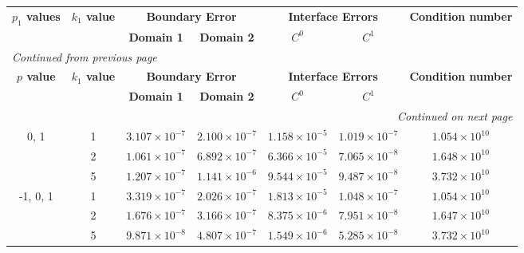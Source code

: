 \begin{table}[!htbp]
    \centering
    \begin{longtable}{ccccccc}
        \toprule
        \multicolumn{1}{c}{\textbf{\(p_1\) values}} & \multicolumn{1}{c}{\textbf{\(k_1\) value}} & \multicolumn{2}{c}{\textbf{Boundary Error}} & \multicolumn{2}{c}{\textbf{Interface Errors}} & \multicolumn{1}{c}{\textbf{Condition number}} \\
        \cmidrule(lr){2-2} \cmidrule(lr){3-4} \cmidrule(lr){5-6} \cmidrule(lr){7-7}
        & & \textbf{Domain 1} & \textbf{Domain 2} & \textbf{\(C^0\)} & \textbf{\(C^1\)} & \\
        \midrule
        \endfirsthead %
        \multicolumn{7}{l}{{\footnotesize\emph{Continued from previous page}}} \\
        \toprule
        \multicolumn{1}{c}{\textbf{\(p\) value}} & \multicolumn{1}{c}{\textbf{\(k_1\) value}} & \multicolumn{2}{c}{\textbf{Boundary Error}} & \multicolumn{2}{c}{\textbf{Interface Errors}} & \multicolumn{1}{c}{\textbf{Condition number}} \\
        \cmidrule(lr){2-2} \cmidrule(lr){3-4} \cmidrule(lr){5-6} \cmidrule(lr){7-7}
        & & \textbf{Domain 1} & \textbf{Domain 2} & \textbf{\(C^0\)} & \textbf{\(C^1\)} & \\
        \midrule
        \endhead %
        \midrule[\heavyrulewidth] %
        \multicolumn{7}{r}{{\footnotesize\emph{Continued on next page}}} \\
        \endfoot %
        \bottomrule
        \endlastfoot %
        
        0, 1 & 1 & $3.107\times10^{-7}$ & $2.100\times10^{-7}$ & $1.158\times10^{-5}$ & $1.019\times10^{-7}$ & $1.054\times10^{10}$ \\
        & 2 & $1.061\times10^{-7}$ & $6.892\times10^{-7}$ & $6.366\times10^{-5}$ & $7.065\times10^{-8}$ & $1.648\times10^{10}$ \\
        & 5 & $1.207\times10^{-7}$ & $1.141\times10^{-6}$ & $9.544\times10^{-5}$ & $9.487\times10^{-8}$ & $3.732\times10^{10}$ \\
        \midrule[\heavyrulewidth] %
        
        -1, 0, 1 & 1 & $3.319\times10^{-7}$ & $2.026\times10^{-7}$ & $1.813\times10^{-5}$ & $1.048\times10^{-7}$ & $1.054\times10^{10}$ \\
        & 2 & $1.676\times10^{-7}$ & $3.166\times10^{-7}$ & $8.375\times10^{-6}$ & $7.951\times10^{-8}$ & $1.647\times10^{10}$ \\
        & 5 & $9.871\times10^{-8}$ & $4.807\times10^{-7}$ & $1.549\times10^{-6}$ & $5.285\times10^{-8}$ & $3.732\times10^{10}$ \\
        \midrule[\heavyrulewidth] %


\end{longtable}
\end{table}

